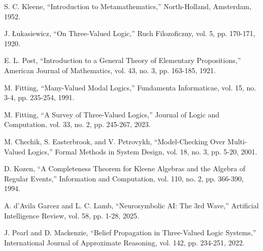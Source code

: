 \documentclass[11pt,a4paper]{article}
\begin{document}

\begin{thebibliography}{99}

S. C. Kleene, ``Introduction to Metamathematics,'' North-Holland, Amsterdam, 1952.

J. Łukasiewicz, ``On Three-Valued Logic,'' Ruch Filozoficzny, vol. 5, pp. 170-171, 1920.

E. L. Post, ``Introduction to a General Theory of Elementary Propositions,'' American Journal of Mathematics, vol. 43, no. 3, pp. 163-185, 1921.

M. Fitting, ``Many-Valued Modal Logics,'' Fundamenta Informaticae, vol. 15, no. 3-4, pp. 235-254, 1991.

M. Fitting, ``A Survey of Three-Valued Logics,'' Journal of Logic and Computation, vol. 33, no. 2, pp. 245-267, 2023.

M. Chechik, S. Easterbrook, and V. Petrovykh, ``Model-Checking Over Multi-Valued Logics,'' Formal Methods in System Design, vol. 18, no. 3, pp. 5-20, 2001.

D. Kozen, ``A Completeness Theorem for Kleene Algebras and the Algebra of Regular Events,'' Information and Computation, vol. 110, no. 2, pp. 366-390, 1994.

A. d'Avila Garcez and L. C. Lamb, ``Neurosymbolic AI: The 3rd Wave,'' Artificial Intelligence Review, vol. 58, pp. 1-28, 2025.

J. Pearl and D. Mackenzie, ``Belief Propagation in Three-Valued Logic Systems,'' International Journal of Approximate Reasoning, vol. 142, pp. 234-251, 2022.

\end{thebibliography}
\end{document}

